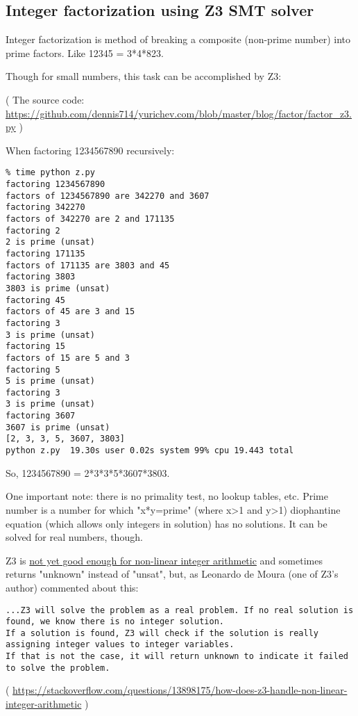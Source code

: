 \subsection{Integer factorization using Z3 SMT solver}
\label{factor_Z3}

Integer factorization is method of breaking a composite (non-prime number) into prime factors.
Like 12345 = 3*4*823.

Though for small numbers, this task can be accomplished by Z3:



( The source code: \url{https://github.com/dennis714/yurichev.com/blob/master/blog/factor/factor_z3.py} )

When factoring 1234567890 recursively:

\begin{lstlisting}
% time python z.py
factoring 1234567890
factors of 1234567890 are 342270 and 3607
factoring 342270
factors of 342270 are 2 and 171135
factoring 2
2 is prime (unsat)
factoring 171135
factors of 171135 are 3803 and 45
factoring 3803
3803 is prime (unsat)
factoring 45
factors of 45 are 3 and 15
factoring 3
3 is prime (unsat)
factoring 15
factors of 15 are 5 and 3
factoring 5
5 is prime (unsat)
factoring 3
3 is prime (unsat)
factoring 3607
3607 is prime (unsat)
[2, 3, 3, 5, 3607, 3803]
python z.py  19.30s user 0.02s system 99% cpu 19.443 total
\end{lstlisting}

So, 1234567890 = 2*3*3*5*3607*3803.

One important note: there is no primality test, no lookup tables, etc.
Prime number is a number for which "x*y=prime" (where x>1 and y>1) diophantine equation (which allows only integers in solution) has no solutions.
It can be solved for real numbers, though.

Z3 is \href{https://github.com/Z3Prover/z3/issues/1264}{not yet good enough for non-linear integer arithmetic}
and sometimes returns "unknown" instead of "unsat", but,
as Leonardo de Moura (one of Z3's author) commented about this:

\begin{lstlisting}
...Z3 will solve the problem as a real problem. If no real solution is found, we know there is no integer solution.
If a solution is found, Z3 will check if the solution is really assigning integer values to integer variables.
If that is not the case, it will return unknown to indicate it failed to solve the problem.
\end{lstlisting}
( \url{https://stackoverflow.com/questions/13898175/how-does-z3-handle-non-linear-integer-arithmetic} )

